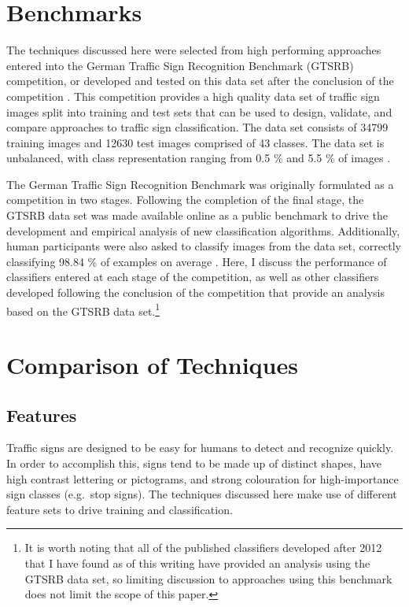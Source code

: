 \documentclass[letterpaper,twocolumn,10pt]{article}
\begin{document}
\section{Benchmarks}

The techniques discussed here were selected from high performing approaches entered into the German Traffic Sign Recognition Benchmark (GTSRB) competition, or developed and tested on this data set after the conclusion of the competition \cite{stallkamp_german_2011, stallkamp_man_2012}. This competition provides a high quality data set of traffic sign images split into training and test sets that can be used to design, validate, and compare approaches to traffic sign classification. The data set consists of 34799 training images and 12630 test images comprised of 43 classes. The data set is unbalanced, with class representation ranging from 0.5 \% and 5.5 \% of images \cite{stallkamp_german_2011}.

The German Traffic Sign Recognition Benchmark was originally formulated as a competition in two stages. Following the completion of the final stage, the GTSRB data set was made available online as a public benchmark to drive the development and empirical analysis of new classification algorithms. Additionally, human participants were also asked to classify images from the data set, correctly classifying 98.84 \% of examples on average \cite{stallkamp_german_2011, stallkamp_man_2012}. Here, I discuss the performance of classifiers entered at each stage of the competition, as well as other classifiers developed following the conclusion of the competition that provide an analysis based on the GTSRB data set.\footnote{It is worth noting that all of the published classifiers developed after 2012 that I have found as of this writing have provided an analysis using the GTSRB data set, so limiting discussion to approaches using this benchmark does not limit the scope of this paper.} 

\section{Comparison of Techniques}

\subsection{Features}

Traffic signs are designed to be easy for humans to detect and recognize quickly. In order to accomplish this, signs tend to be made up of distinct shapes, have high contrast lettering or pictograms, and strong colouration for high-importance sign classes (e.g.\ stop signs). The techniques discussed here make use of different feature sets to drive training and classification. 
\end{document}
